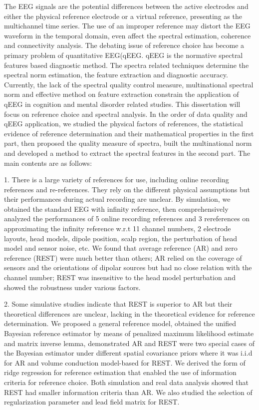 \begin{englishabstract}
The EEG signals are the potential differences between the active electrodes and either the physical reference electrode or a virtual reference, presenting as the multichannel time series. The use of an improper reference may distort the EEG waveform in the temporal domain, even affect the spectral estimation, coherence and connectivity analysis. The debating issue of reference choice has become a primary problem of quantitative EEG(qEEG. qEEG is the normative spectral features based diagnostic method. The
spectra related techniques determine the spectral norm estimation, the feature extraction and diagnostic accuracy. Currently, the lack of the spectral quality control measure, multinational spectral norm and effective method on feature extraction constrain the application of qEEG in cognition and mental disorder related studies. This dissertation will focus on reference choice and spectral analysis. In the order of data quality and qEEG application, we studied the physical factors of references, the statistical evidence of reference determination and their mathematical properties in the first part, then proposed the quality measure of spectra, built the multinational norm and developed a method to extract the spectral features in the second part. The main contents are as follows:

1. There is a large variety of references for use, including online recording references and re­-references. They rely on the different physical assumptions but their performances during actual recording are unclear. By simulation, we obtained the standard EEG with infinity reference, then comprehensively analyzed the performances of 5 online recording references and 3 re­references on approximating the infinity reference w.r.t 11 channel numbers, 2 electrode layouts, head models, dipole position, scalp region, the perturbation of head model and sensor noise, etc. We found that average reference (AR) and zero reference (REST) were much better than others; AR relied on the coverage of sensors and the orientations of dipolar sources but had no close relation with the channel number; REST was insensitive to the head model perturbation and showed the robustness under various factors.

2. Some simulative studies indicate that REST is superior to AR but their theoretical differences are unclear, lacking in the theoretical evidence for reference determination. We proposed a general reference model, obtained the unified Bayesian reference estimator by means of penalized maximum likelihood estimate and matrix inverse lemma, demonstrated AR and REST were two special cases of the Bayesian estimator under different spatial covariance priors where it was i.i.d for AR and volume conduction model-based
for REST. We derived the form of ridge regression for reference estimation that enabled the use of information criteria for reference choice. Both simulation and real data analysis showed that REST had smaller information criteria than AR. We also studied the
selection of regularization parameter and lead field matrix for REST.


\end{englishabstract}

